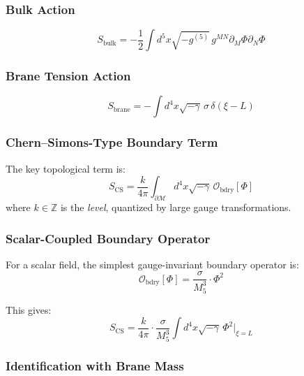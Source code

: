 \documentclass[11pt,a4paper]{article}
\newcommand{\Mfive}{M_5}
\theoremstyle{definition}
\theoremstyle{plain}
\theoremstyle{remark}
\begin{document}
\subsubsection{Bulk Action}

\begin{equation}
S_{\mathrm{bulk}} = -\frac{1}{2}\int d^5x \sqrt{-g^{(5)}} \, g^{MN}\partial_M\Phi\partial_N\Phi
\label{eq:bulk-action}
\end{equation}

\subsubsection{Brane Tension Action}

\begin{equation}
S_{\mathrm{brane}} = -\int d^4x \sqrt{-\gamma} \, \sigma \, \delta(\xi - L)
\label{eq:brane-tension}
\end{equation}

\subsubsection{Chern--Simons-Type Boundary Term}

The key topological term is:
\begin{equation}
S_{\mathrm{CS}} = \frac{k}{4\pi} \int_{\partial\mathcal{M}} d^4x \sqrt{-\gamma} \, \mathcal{O}_{\mathrm{bdry}}[\Phi]
\label{eq:SCS}
\end{equation}
where $k \in \mathbb{Z}$ is the \emph{level}, quantized by large gauge transformations.

\subsubsection{Scalar-Coupled Boundary Operator}

For a scalar field, the simplest gauge-invariant boundary operator is:
\begin{equation}
\mathcal{O}_{\mathrm{bdry}}[\Phi] = \frac{\sigma}{\Mfive^3} \cdot \Phi^2
\label{eq:O-bdry}
\end{equation}

This gives:
\begin{equation}
S_{\mathrm{CS}} = \frac{k}{4\pi} \cdot \frac{\sigma}{\Mfive^3} \int d^4x \sqrt{-\gamma} \, \Phi^2 \big|_{\xi=L}
\label{eq:SCS-explicit}
\end{equation}

\subsubsection{Identification with Brane Mass}
\end{document}
